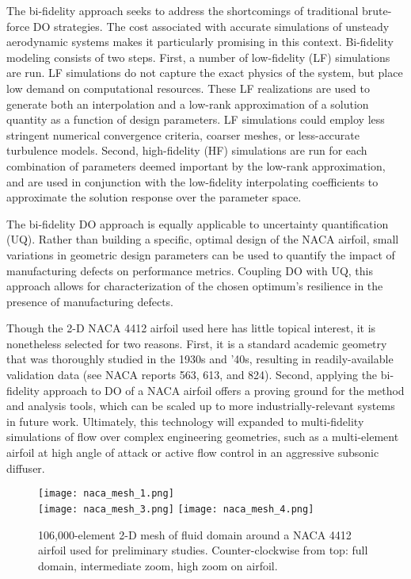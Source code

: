 \documentclass[11pt]{article}
\begin{document}
The bi-fidelity approach seeks to address the shortcomings of traditional brute-force DO strategies. The cost associated with accurate simulations of unsteady aerodynamic systems makes it particularly promising in this context. Bi-fidelity modeling consists of two steps. First, a number of low-fidelity (LF) simulations are run. LF simulations do not capture the exact physics of the system, but place low demand on computational resources. These LF realizations are used to generate both an interpolation and a low-rank approximation of a solution quantity as a function of design parameters. LF simulations could employ less stringent numerical convergence criteria, coarser meshes, or less-accurate turbulence models. Second, high-fidelity (HF) simulations are run for each combination of parameters deemed important by the low-rank approximation, and are used in conjunction with the low-fidelity interpolating coefficients to approximate the solution response over the parameter space.

The bi-fidelity DO approach is equally applicable to uncertainty quantification (UQ). Rather than building a specific, optimal design of the NACA airfoil, small variations in geometric design parameters can be used to quantify the impact of manufacturing defects on performance metrics. Coupling DO with UQ, this approach allows for characterization of the chosen optimum's resilience in the presence of manufacturing defects.

Though the 2-D NACA 4412 airfoil used here has little topical interest, it is nonetheless selected for two reasons. First, it is a standard academic geometry that was thoroughly studied in the 1930s and '40s, resulting in readily-available validation data (see NACA reports 563, 613, and 824). Second, applying the bi-fidelity approach to DO of a NACA airfoil offers a proving ground for the method and analysis tools, which can be scaled up to more industrially-relevant systems in future work. Ultimately, this technology will expanded to multi-fidelity simulations of flow over complex engineering geometries, such as a multi-element airfoil at high angle of attack or active flow control in an aggressive subsonic diffuser.

\begin{figure}[ht]
\begin{center}
\texttt{[image: naca\_mesh\_1.png]}
\\[1.5ex]
\texttt{[image: naca\_mesh\_3.png]}
\hspace*{1ex}
\texttt{[image: naca\_mesh\_4.png]}
\vspace{1ex}
\caption{106,000-element 2-D mesh of fluid domain around a NACA 4412 airfoil used for preliminary studies. Counter-clockwise from top: full domain, intermediate zoom, high zoom on airfoil.}
\label{fig:mesh}
\end{center}
\end{figure}
\end{document}
